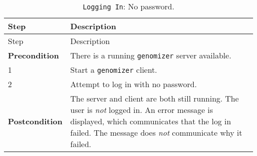 \begin{longtable}[c]{@{}ll@{}}
\caption{\texttt{Logging\ In}: No password.}\tabularnewline
\toprule
\begin{minipage}[b]{0.31\columnwidth}\raggedright\strut
Step
\strut\end{minipage} &
\begin{minipage}[b]{0.63\columnwidth}\raggedright\strut
Description
\strut\end{minipage}\tabularnewline
\midrule
\endfirsthead
\toprule
\begin{minipage}[b]{0.31\columnwidth}\raggedright\strut
Step
\strut\end{minipage} &
\begin{minipage}[b]{0.63\columnwidth}\raggedright\strut
Description
\strut\end{minipage}\tabularnewline
\midrule
\endhead
\begin{minipage}[t]{0.31\columnwidth}\raggedright\strut
\textbf{Precondition}
\strut\end{minipage} &
\begin{minipage}[t]{0.63\columnwidth}\raggedright\strut
There is a running \texttt{genomizer} server available.
\strut\end{minipage}\tabularnewline
\begin{minipage}[t]{0.31\columnwidth}\raggedright\strut
1
\strut\end{minipage} &
\begin{minipage}[t]{0.63\columnwidth}\raggedright\strut
Start a \texttt{genomizer} client.
\strut\end{minipage}\tabularnewline
\begin{minipage}[t]{0.31\columnwidth}\raggedright\strut
2
\strut\end{minipage} &
\begin{minipage}[t]{0.63\columnwidth}\raggedright\strut
Attempt to log in with no password.
\strut\end{minipage}\tabularnewline
\begin{minipage}[t]{0.31\columnwidth}\raggedright\strut
\textbf{Postcondition}
\strut\end{minipage} &
\begin{minipage}[t]{0.63\columnwidth}\raggedright\strut
The server and client are both still running. The user is \emph{not}
logged in. An error message is displayed, which communicates that the
log in failed. The message does \emph{not} communicate why it failed.
\strut\end{minipage}\tabularnewline
\bottomrule
\end{longtable}

